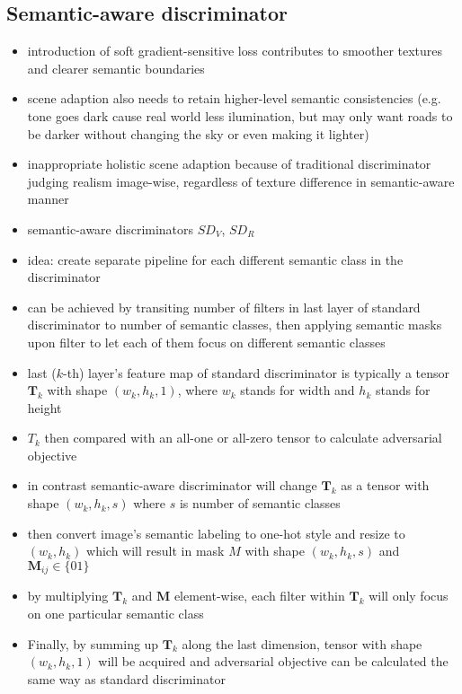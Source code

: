 \subsection{Semantic-aware discriminator}
\begin{itemize}
	\item introduction of soft gradient-sensitive loss contributes to smoother textures and clearer semantic boundaries
	\item scene adaption also needs to retain higher-level semantic consistencies (e.g. tone goes dark cause real world less ilumination, but may only want roads to be darker without changing the sky or even making it lighter)
	\item inappropriate holistic scene adaption because of traditional discriminator judging realism image-wise, regardless of texture difference in semantic-aware manner
	\item semantic-aware discriminators $SD_V$, $SD_R$
	\item idea: create separate pipeline for each different semantic class in the discriminator
	\item can be achieved by transiting number of filters in last layer of standard discriminator to number of semantic classes, then applying semantic masks upon filter to let each of them focus on different semantic classes
	\item last ($k$-th) layer's feature map of standard discriminator is typically a tensor $\mathbf{T}_k$ with shape $(w_k, h_k, 1)$, where $w_k$ stands for width and $h_k$ stands for height
	\item $T_k$ then compared with an all-one or all-zero tensor to calculate adversarial objective
	\item in contrast semantic-aware discriminator will change $\mathbf{T}_k$ as a tensor with shape $(w_k, h_k,s)$ where $s$ is number of semantic classes
	\item then convert image's semantic labeling to one-hot style and resize to $(w_k, h_k)$ which will result in mask $M$ with shape $(w_k, h_k, s)$ and $\mathbf{M}_{ij} \in \{01\}$
	\item by multiplying $\mathbf{T}_k$ and $\mathbf{M}$ element-wise, each filter within $\mathbf{T}_k$ will only focus on one particular semantic class
	\item Finally, by summing up $\mathbf{T}_k$ along the last dimension, tensor with shape $(w_k, h_k, 1)$ will be acquired and adversarial objective can be calculated the same way as standard discriminator
\end{itemize}
